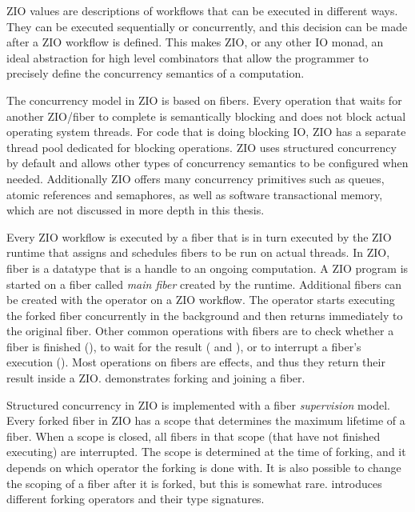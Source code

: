 ZIO values are descriptions of workflows that can be executed in different ways. They can be executed sequentially or concurrently, and this decision can be made after a ZIO workflow is defined. This makes ZIO, or any other IO monad, an ideal abstraction for high level combinators that allow the programmer to precisely define the concurrency semantics of a computation.

The concurrency model in ZIO is based on fibers. Every operation that waits for another ZIO/fiber to complete is semantically blocking and does not block actual operating system threads. For code that is doing blocking IO, ZIO has a separate thread pool dedicated for blocking operations. ZIO uses structured concurrency by default and allows other types of concurrency semantics to be configured when needed. Additionally ZIO offers many concurrency primitives such as queues, atomic references and semaphores, as well as software transactional memory, which are not discussed in more depth in this thesis.

Every ZIO workflow is executed by a fiber that is in turn executed by the ZIO runtime that assigns and schedules fibers to be run on actual threads. In ZIO, fiber is a datatype that is a handle to an ongoing computation. A ZIO program is started on a fiber called \emph{main fiber} created by the runtime. Additional fibers can be created with the  operator on a ZIO workflow. The  operator starts executing the forked fiber concurrently in the background and then returns immediately to the original fiber. Other common operations with fibers are to check whether a fiber is finished (), to wait for the result ( and ), or to interrupt a fiber's execution (). Most operations on fibers are effects, and thus they return their result inside a ZIO.  demonstrates forking and joining a fiber.



Structured concurrency in ZIO is implemented with a fiber \emph{supervision} model. Every forked fiber in ZIO has a scope that determines the maximum lifetime of a fiber. When a scope is closed, all fibers in that scope (that have not finished executing) are interrupted. The scope is determined at the time of forking, and it depends on which operator the forking is done with. It is also possible to change the scoping of a fiber after it is forked, but this is somewhat rare.  introduces different forking operators and their type signatures.

